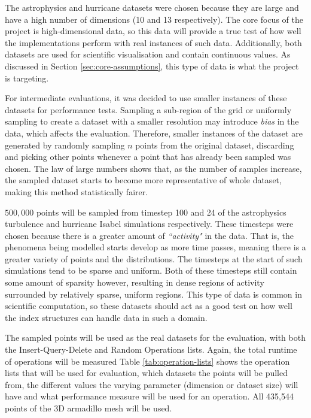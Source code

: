 The astrophysics and hurricane datasets were chosen because they are large and have a high number of dimensions (10 and 13 respectively). The core focus of the project is high-dimensional data, so this data will provide a true test of how well the implementations perform with real instances of such data. Additionally, both datasets are used for scientific visualisation and contain continuous values. As discussed in Section \ref{sec:core-assumptions}, this type of data is what the project is targeting.

For intermediate evaluations, it was decided to use smaller instances of these datasets for performance tests. Sampling a sub-region of the grid or uniformly sampling to create a dataset with a smaller resolution may introduce \textit{bias} in the data, which affects the evaluation. Therefore, smaller instances of the dataset are generated by randomly sampling $n$ points from the original dataset, discarding and picking other points whenever a point that has already been sampled was chosen. The law of large numbers \cite{large-sample-theory} shows that, as the number of samples increase, the sampled dataset starts to become more representative of whole dataset, making this method statistically fairer.

$500,000$ points will be sampled from timestep 100 and 24 of the astrophysics turbulence and hurricane Isabel simulations respectively. These timesteps were chosen because there is a greater amount of \textit{``activity"} in the data. That is, the phenomena being modelled starts develop as more time passes, meaning there is a greater variety of points and the distributions. The timesteps at the start of such simulations tend to be sparse and uniform. Both of these timesteps still contain some amount of sparsity however, resulting in dense regions of activity surrounded by relatively sparse, uniform regions. This type of data is common in scientific computation, so these datasets should act as a good test on how well the index structures can handle data in such a domain.

The sampled points will be used as the real datasets for the evaluation, with both the Insert-Query-Delete and Random Operations lists. Again, the total runtime of operations will be measured Table \ref{tab:operation-lists} shows the operation lists that will be used for evaluation, which datasets the points will be pulled from, the different values the varying parameter (dimension or dataset size) will have and what performance measure will be used for an operation. All 435,544 points of the 3D armadillo mesh will be used.


